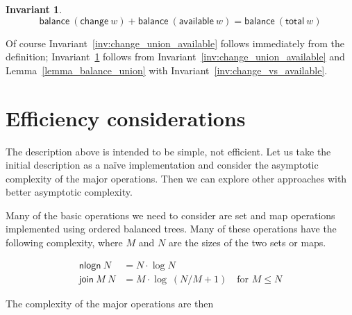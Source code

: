 \documentclass{article}
\newtheorem{invariant}{Invariant}
\begin{document}
\begin{invariant}
\begin{equation*}
\mathsf{balance} ~ (\mathsf{change} ~ w) + \mathsf{balance} ~ (\mathsf{available} ~ w) = \mathsf{balance} ~ (\mathsf{total} ~ w)
\end{equation*}
\label{inv:balance_change_available}
\end{invariant}

Of course Invariant~\ref{inv:change_union_available} follows immediately from
the definition; Invariant~\ref{inv:balance_change_available} follows from
Invariant~\ref{inv:change_union_available} and Lemma~\ref{lemma_balance_union}
with Invariant~\ref{inv:change_vs_available}.

\section{Efficiency considerations}

The description above is intended to be simple, not efficient. Let us take the
initial description as a na\"ive implementation and consider the asymptotic
complexity of the major operations. Then we can explore other approaches with
better asymptotic complexity.

Many of the basic operations we need to consider are set and map operations
implemented using ordered balanced trees. Many of these operations have the
following complexity, where $M$ and $N$ are the sizes of the two sets or maps.

\begin{equation*}
\begin{split}
\mathsf{nlogn} ~ N & = N \cdot \log N \\
\mathsf{join} ~ M ~ N & = M \cdot \log ~ (N/M + 1) \quad \text{for } M \leq N
\end{split}
\end{equation*}

The complexity of the major operations are then
\end{document}
